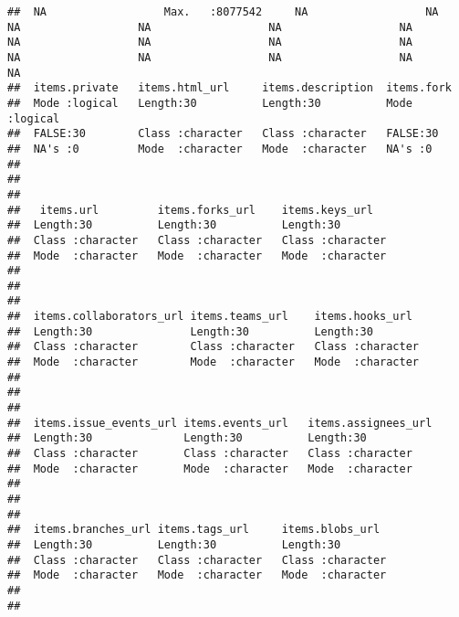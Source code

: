 \documentclass{article}\usepackage[]{graphicx}\usepackage[]{color}
\makeatletter
\newenvironment{kframe}{%
 \def\at@end@of@kframe{}%
 \ifinner\ifhmode%
  \def\at@end@of@kframe{\end{minipage}}%
  \begin{minipage}{\columnwidth}%
 \fi\fi%
 \def\FrameCommand##1{\hskip\@totalleftmargin \hskip-\fboxsep
 \colorbox{shadecolor}{##1}\hskip-\fboxsep
     \hskip-\linewidth \hskip-\@totalleftmargin \hskip\columnwidth}%
 \MakeFramed {\advance\hsize-\width
   \@totalleftmargin\z@ \linewidth\hsize
   \@setminipage}}%
 {\par\unskip\endMakeFramed%
 \at@end@of@kframe}
\newenvironment{knitrout}{}{} %
\makeatother
\begin{document}
\begin{knitrout}
\begin{kframe}
\begin{verbatim}
##  NA                  Max.   :8077542     NA                  NA                  NA                  NA                  NA                  NA                  NA                  NA                  NA                  NA                  NA                  NA                  NA                  NA                  NA                                                                                               
##  items.private   items.html_url     items.description  items.fork     
##  Mode :logical   Length:30          Length:30          Mode :logical  
##  FALSE:30        Class :character   Class :character   FALSE:30       
##  NA's :0         Mode  :character   Mode  :character   NA's :0        
##                                                                       
##                                                                       
##                                                                       
##   items.url         items.forks_url    items.keys_url    
##  Length:30          Length:30          Length:30         
##  Class :character   Class :character   Class :character  
##  Mode  :character   Mode  :character   Mode  :character  
##                                                          
##                                                          
##                                                          
##  items.collaborators_url items.teams_url    items.hooks_url   
##  Length:30               Length:30          Length:30         
##  Class :character        Class :character   Class :character  
##  Mode  :character        Mode  :character   Mode  :character  
##                                                               
##                                                               
##                                                               
##  items.issue_events_url items.events_url   items.assignees_url
##  Length:30              Length:30          Length:30          
##  Class :character       Class :character   Class :character   
##  Mode  :character       Mode  :character   Mode  :character   
##                                                               
##                                                               
##                                                               
##  items.branches_url items.tags_url     items.blobs_url   
##  Length:30          Length:30          Length:30         
##  Class :character   Class :character   Class :character  
##  Mode  :character   Mode  :character   Mode  :character  
##                                                          
##                                                          

\end{verbatim}
\end{kframe}
\end{knitrout}
\end{document}
